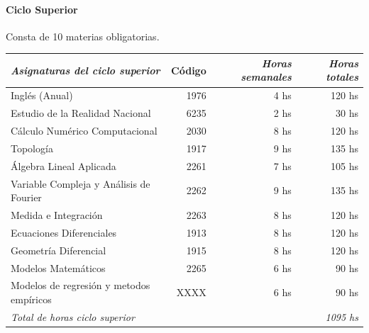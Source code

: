 \documentclass[a4paper, 12pt]{article}
\newenvironment{colortext}[1]{\color{#1}}{\ignorespacesafterend}
\begin{document}
\begin{colortext}{blue}
\paragraph{Ciclo Superior} Consta de 10 materias
obligatorias.

\begin{center}
\begin{tabular}{|l|r|r|r|}\hline
  \rowcolor[gray]{.9}
\emph{Asignaturas del ciclo superior  }  & Código &\emph{Horas semanales} &  \emph{Horas totales}\\ \hline
Inglés  (Anual)                            & 1976   &           4 hs        &     120 hs           \\ \hline
Estudio de la Realidad Nacional          & 6235   &           2 hs        &      30 hs           \\ \hline
Cálculo Numérico  Computacional          & 2030   &           8 hs        &     120 hs           \\ \hline
Topología                                & 1917   &           9 hs        &     135 hs           \\ \hline
Álgebra Lineal Aplicada                  & 2261   &           7 hs        &     105 hs           \\ \hline
Variable Compleja y Análisis de Fourier  & 2262   &           9 hs        &     135 hs           \\ \hline
Medida e Integración                     & 2263   &           8 hs        &     120 hs           \\ \hline
Ecuaciones Diferenciales                 & 1913   &           8 hs        &     120 hs           \\ \hline
Geometría Diferencial                    & 1915   &           8 hs        &     120 hs           \\ \hline
Modelos Matemáticos                      & 2265   &           6 hs        &      90 hs           \\ \hline
Modelos de regresión y metodos empíricos  & XXXX  &           6 hs 
& 90 hs   \\ \hline
\emph{Total de horas ciclo superior }    &\multicolumn{3}{r|}{\emph{1095 hs}}                    \\ \hline
\end{tabular}
\end{center}




\end{colortext}
\end{document}
